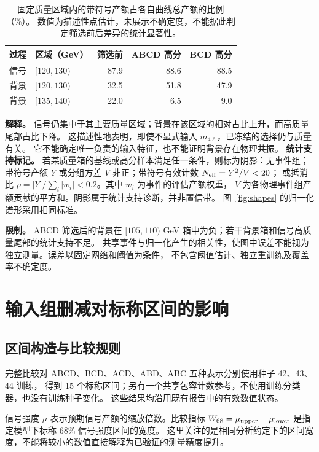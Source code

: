 \documentclass[11pt,a4paper,fontset=fandol,scheme=plain]{ctexart}
\begin{document}
\begin{table}[H]
\caption{固定质量区域内的带符号产额占各自曲线总产额的比例（\%）。
数值为描述性点估计，未展示不确定度，不能据此判定筛选前后差异的统计显著性。}
\label{tab:fractions}
\centering
\small
\begin{tabular}{llrrr}
\toprule
过程 & 区域（GeV） & 筛选前 & ABCD 高分 & BCD 高分 \\
\midrule
信号 & $[120,130)$ & 87.9 & 88.6 & 88.5 \\
背景 & $[120,130)$ & 32.5 & 51.8 & 47.9 \\
背景 & $[135,140)$ & 22.0 & 6.5 & 9.0 \\
\bottomrule
\end{tabular}
\end{table}

\textbf{解释。} 信号仍集中于其主要质量区域；背景在该区域的相对占比上升，而高质量尾部占比下降。
这描述性地表明，即使不显式输入 $m_{4\ell}$，已冻结的选择仍与质量有关。
它不能确定唯一负责的输入特征，也不能证明背景存在物理共振。
\FloatBarrier
\textbf{统计支持标记。} 若某质量箱的基线或高分样本满足任一条件，则标为阴影：无事件组；
带符号产额 $Y$ 或分组方差 $V$ 非正；带符号有效计数 $N_{\rm eff}=Y^2/V<20$；
或抵消比 $\rho=|Y|/\sum_i|w_i|<0.2$。其中 $w_i$ 为事件的评估产额权重，
$V$ 为各物理事件组产额贡献的平方和。阴影属于统计支持诊断，并非置信带。
图~\ref{fig:shapes} 的归一化谱形采用相同标准。

\textbf{限制。} ABCD 筛选后的背景在 $[105,110)$ GeV 箱中为负；若干背景箱和信号高质量尾部的统计支持不足。
共享事件与归一化产生的相关性，使图中误差不能视为独立测量。误差以固定网络和阈值为条件，
不包含阈值估计、独立重训练及覆盖率不确定度。
\FloatBarrier

\section{输入组删减对标称区间的影响}

\subsection{区间构造与比较规则}

完整比较对 ABCD、BCD、ACD、ABD、ABC 五种表示分别使用种子 42、43、44 训练，
得到 15 个标称区间；另有一个共享包容计数参考，不使用训练分类器，也没有训练种子变化。
这些结果均沿用既有报告中的有效数值状态。

信号强度 $\mu$ 表示预期信号产额的缩放倍数。比较指标
$W_{68}=\mu_{\rm upper}-\mu_{\rm lower}$ 是指定模型下标称 68\% 信号强度区间的宽度。
这里关注的是相同分析约定下的区间宽度，不能将较小的数值直接解释为已验证的测量精度提升。
\end{document}

